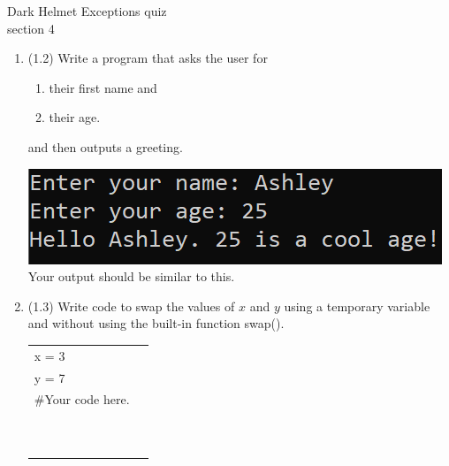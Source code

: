 \documentclass{article}
\begin{document}
\pagebreak
Dark Helmet \hfill Exceptions quiz\\
section 4\\
\begin{enumerate}
\item (1.2) Write a program that asks the user for \\
		\begin{minipage}{0.5\textwidth}
		\vspace*{-0.5em}
			\begin{enumerate}  \setlength\itemsep{-0.3em}
				\item their first name and
				\item their age.  
			\end{enumerate} \vspace*{-1ex}
		and then outputs a greeting.
		\end{minipage}
		\begin{minipage}{0.5\textwidth}
			\centering
			\includegraphics[scale=0.95]{./imgs/outputGreetingWithAge.png}\\
			Your output should be similar to this.
		\end{minipage}




\item (1.3) 
		Write code to swap the values of $x$ and $y$ using a temporary variable and without using
		the built-in function swap().\\		
		\begin{tabular}{|ll}
			\\			
			x = 3\\
			y = 7\\[5pt]
			\#Your code here. \\[5pt]
			& \\ & \\ & \\ & \\ & \\ & \\ & \\ & \\ & \\ & \\ 
		\end{tabular}



\end{enumerate}
\end{document}
